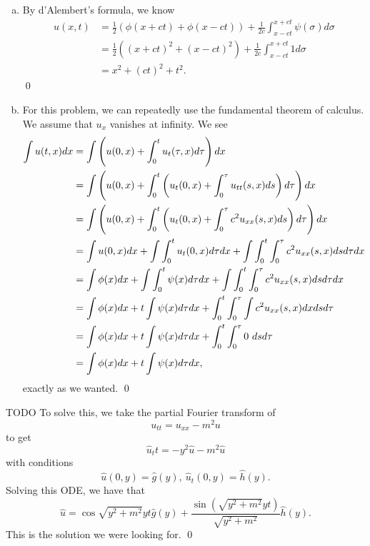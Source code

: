 \documentclass{article}
\begin{document}
\begin{enumerate}[(a)]
    \item By d'Alembert's formula, we know 
    \begin{align*}
        u(x,t) &= \frac{1}{2}(\phi(x+ct)+\phi(x-ct)) + \frac{1}{2c}\int_{x-ct}^{x+ct} \psi(\sigma) d \sigma\\
        &= \frac{1}{2}((x+ct)^2+(x-ct)^2) + \frac{1}{2c}\int_{x-ct}^{x+ct} 1 d \sigma\\
        &= x^2 + (ct)^2 + t^2.
    \end{align*}
    \qed
    \item For this problem, we can repeatedly use the fundamental theorem of calculus. We assume that $u_x$ vanishes at infinity. We see 
    \begin{align*}
        \int u(t,x) dx &= \int \del{u(0,x) + \int_0^t u_t(\tau, x)d\tau} dx \\
        &= \int \del{u(0,x) + \int_0^t \del{u_t(0, x) +\int_0^\tau u_{tt}(s,x)ds}d\tau} dx\\
        &= \int \del{u(0,x) + \int_0^t \del{u_t(0, x) +\int_0^\tau c^2u_{xx}(s,x)ds}d\tau} dx\\
        &= \int u(0,x) dx  +\int \int_0^t u_t(0, x) d\tau dx+\int \int_0^t \int_0^\tau c^2u_{xx}(s,x)dsd\tau dx\\
        &= \int \phi(x) dx  +\int \int_0^t \psi(x) d\tau dx+\int \int_0^t \int_0^\tau c^2u_{xx}(s,x)dsd\tau dx\\
        &= \int \phi(x) dx  +t\int \psi(x) d\tau dx+ \int_0^t \int_0^\tau \int c^2u_{xx}(s,x) dx dsd\tau \\
        &= \int \phi(x) dx  +t\int \psi(x) d\tau dx+ \int_0^t \int_0^\tau 0\  dsd\tau \\
        &= \int \phi(x) dx  +t\int \psi(x) d\tau dx,
    \end{align*}
    exactly as we wanted. \qed
\end{enumerate}


\newpage
{} TODO
 \tri
\hop 
\solution
To solve this, we take the partial Fourier transform of 
\[u_{tt} = u_{xx} - m^2u\]
to get 
\[\hat{u}_tt = -y^2 \hat{u} - m^2 \hat{u}\]
with conditions 
\[\hat{u}(0,y) = \hat{g}(y), \ \hat{u}_t(0,y) = \hat{h}(y).\]
Solving this ODE, we have that 
\[\hat{u} = \cos{\sqrt{y^2 + m^2}yt}\hat{g}(y) + \frac{\sin(\sqrt{y^2+m^2}yt)}{\sqrt{y^2+m^2}}\hat{h}(y).\]
This is the solution we were looking for. \qed
\end{document}
